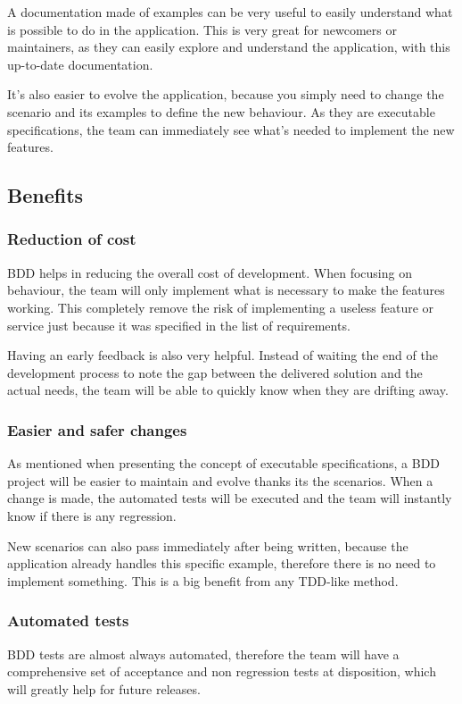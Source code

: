 A documentation made of examples can be very useful to easily understand
what is possible to do in the application.
This is very great for newcomers or maintainers, as they can easily explore
and understand the application, with this up-to-date documentation.

It's also easier to evolve the application, because you simply need to change
the scenario and its examples to define the new behaviour.
As they are executable specifications, the team can immediately see what's
needed to implement the new features.

\subsection{Benefits}\label{subsec:benefits}

\subsubsection{Reduction of cost}
BDD helps in reducing the overall cost of development.
When focusing on behaviour, the team will only implement what is necessary to
make the features working.
This completely remove the risk of implementing a useless feature or service
just because it was specified in the list of requirements.

Having an early feedback is also very helpful.
Instead of waiting the end of the development process to note the gap
between the delivered solution and the actual needs, the team will be able to
quickly know when they are drifting away.

\subsubsection{Easier and safer changes}
As mentioned when presenting the concept of executable specifications, a BDD
project will be easier to maintain and evolve thanks its the scenarios.
When a change is made, the automated tests will be executed and the team will
instantly know if there is any regression.

New scenarios can also pass immediately after being written, because the
application already handles this specific example, therefore there is no need
to implement something.
This is a big benefit from any TDD-like method.

\subsubsection{Automated tests}
BDD tests are almost always automated, therefore the team will have a
comprehensive set of acceptance and non regression tests at disposition, which
will greatly help for future releases.

